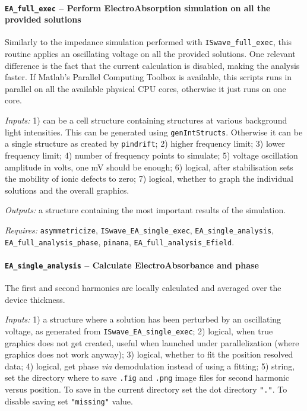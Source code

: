 		\paragraph{\texttt{EA\_full\_exec} -- Perform ElectroAbsorption simulation on all the provided solutions}
		Similarly to the impedance simulation performed with \texttt{IS\-wave\_full\_exec}, this routine applies an oscillating voltage on all the provided solutions.
		One relevant difference is the fact that the current calculation is disabled, making the analysis faster.
		If Matlab's Parallel Computing Toolbox is available, this scripts runs in parallel on all the available physical CPU cores, otherwise it just runs on one core.

		\textit{Inputs:} 1) can be a cell structure containing structures at various background
		light intensities. This can be generated using \texttt{gen\-Int\-Structs}.
		Otherwise it can be a single structure as created by \texttt{pin\-drift};
		2) higher frequency limit;
		3) lower frequency limit;
		4) number of frequency points to simulate;
		5) voltage oscillation amplitude in volts, one mV should be enough;
		6) logical, after stabilisation sets the mobility of
		ionic defects to zero;
		7) logical, whether to graph the individual solutions and
		the overall graphics.

		\textit{Outputs:} a structure containing the most important results of the simulation.

		\textit{Requires:} \texttt{asymmetricize}, \texttt{IS\-wave\_EA\_single\_exec},
		\texttt{EA\_single\_analysis}, \texttt{EA\_full\_analysis\_phase}, \texttt{pinana}, \texttt{EA\_full\_analysis\_Efield}.

		\paragraph{\texttt{EA\_single\_analysis} -- Calculate ElectroAbsorbance and phase}
		The first and second harmonics are locally calculated and averaged over the device thickness.

		\textit{Inputs:} 1) a structure where a solution has been perturbed by an
		oscillating voltage, as generated from \texttt{IS\-wave\_EA\_single\_exec};
		2) logical, when true graphics does not get created, useful when
		launched under parallelization (where graphics does not work anyway);
		3) logical, whether to fit the position resolved data;
		4) logical, get phase \textsl{via} demodulation instead of using a fitting;
		5) string, set the directory where to save \texttt{.fig} and \texttt{.png}
		image files for second harmonic versus position.
		To save in the current directory set the dot directory \texttt{"."}.
		To disable saving set \texttt{"missing"} value.

